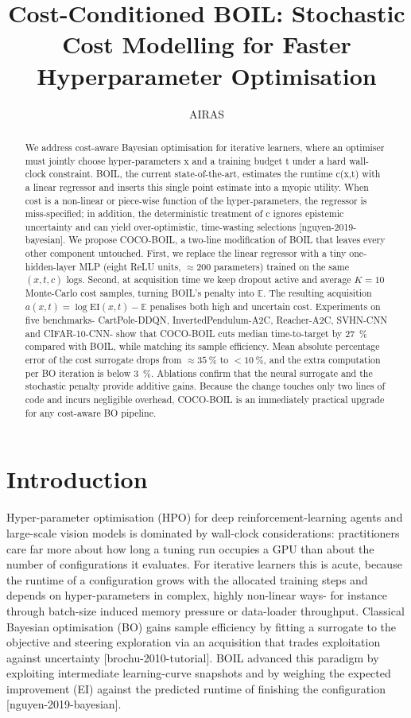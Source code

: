 \documentclass{article}
\title{Cost-Conditioned BOIL: Stochastic Cost Modelling for Faster Hyperparameter Optimisation}
\author{AIRAS}
\begin{document}
\maketitle

\begin{abstract}
We address cost-aware Bayesian optimisation for iterative learners, where an optimiser must jointly choose hyper-parameters x and a training budget t under a hard wall-clock constraint. BOIL, the current state-of-the-art, estimates the runtime c(x,t) with a linear regressor and inserts this single point estimate into a myopic utility. When cost is a non-linear or piece-wise function of the hyper-parameters, the regressor is miss-specified; in addition, the deterministic treatment of c ignores epistemic uncertainty and can yield over-optimistic, time-wasting selections [nguyen-2019-bayesian]. We propose COCO-BOIL, a two-line modification of BOIL that leaves every other component untouched. First, we replace the linear regressor with a tiny one-hidden-layer MLP (eight ReLU units, $\approx 200$ parameters) trained on the same $(x,t,c)$ logs. Second, at acquisition time we keep dropout active and average $K=10$ Monte-Carlo cost samples, turning BOIL's penalty into $\mathbb{E}$. The resulting acquisition $a(x,t)=\log \mathrm{EI}(x,t)-\mathbb{E}$ penalises both high and uncertain cost. Experiments on five benchmarks- CartPole-DDQN, InvertedPendulum-A2C, Reacher-A2C, SVHN-CNN and CIFAR-10-CNN- show that COCO-BOIL cuts median time-to-target by 27\ \% compared with BOIL, while matching its sample efficiency. Mean absolute percentage error of the cost surrogate drops from $\approx 35\ \%$ to $<10\ \%$, and the extra computation per BO iteration is below 3\ \%. Ablations confirm that the neural surrogate and the stochastic penalty provide additive gains. Because the change touches only two lines of code and incurs negligible overhead, COCO-BOIL is an immediately practical upgrade for any cost-aware BO pipeline.
\end{abstract}

\section{Introduction}
Hyper-parameter optimisation (HPO) for deep reinforcement-learning agents and large-scale vision models is dominated by wall-clock considerations: practitioners care far more about how long a tuning run occupies a GPU than about the number of configurations it evaluates. For iterative learners this is acute, because the runtime of a configuration grows with the allocated training steps and depends on hyper-parameters in complex, highly non-linear ways- for instance through batch-size induced memory pressure or data-loader throughput. Classical Bayesian optimisation (BO) gains sample efficiency by fitting a surrogate to the objective and steering exploration via an acquisition that trades exploitation against uncertainty [brochu-2010-tutorial]. BOIL advanced this paradigm by exploiting intermediate learning-curve snapshots and by weighing the expected improvement (EI) against the predicted runtime of finishing the configuration [nguyen-2019-bayesian].
\end{document}
